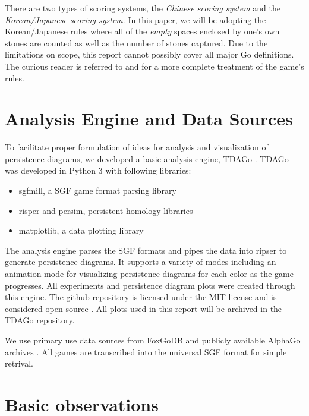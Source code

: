 \documentclass[11pt]{article}
\begin{document}
There are two types of scoring systems, the \textit{Chinese scoring system} and the \textit{Korean/Japanese scoring system}. In this paper, we will be adopting the Korean/Japanese rules where all of the \textit{empty} spaces enclosed by one's own stones are counted as well as the number of stones captured. Due to the limitations on scope, this report cannot possibly cover all major Go definitions. The curious reader is referred to \cite{muller} and \cite{terms} for a more complete treatment of the game's rules.

\section{Analysis Engine and Data Sources}

To facilitate proper formulation of ideas for analysis and visualization of persistence diagrams, we developed a basic analysis engine, TDAGo \cite{tdago}. TDAGo was developed in Python 3 with following libraries:
\begin{itemize}
   \item sgfmill, a SGF game format parsing library
   \item risper and persim, persistent homology libraries
   \item matplotlib, a data plotting library
\end{itemize}

The analysis engine parses the SGF formats and pipes the data into ripser to generate persistence diagrams. It supports a variety of modes including an animation mode for visualizing persistence diagrams for each color as the game progresses. All experiments and persistence diagram plots were created through this engine. The github repository is licensed under the MIT license and is considered open-source  \cite{tdago}. All plots used in this report will be archived in the TDAGo repository.

We use primary use data sources from FoxGoDB \cite{fox} and publicly available AlphaGo archives \cite{alphalib}. All games are transcribed into the universal SGF format for simple retrival.

\section{Basic observations}
\end{document}
